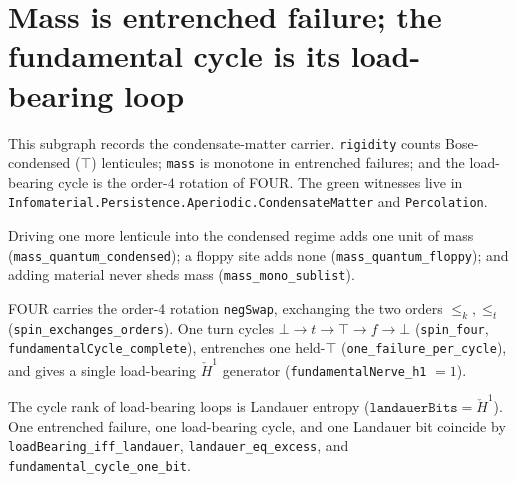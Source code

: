 \section{Mass is entrenched failure; the fundamental cycle is its load-bearing loop}

This subgraph records the condensate-matter carrier.  \texttt{rigidity} counts
Bose-condensed ($\top$) lenticules; \texttt{mass} is monotone in entrenched
failures; and the load-bearing cycle is the order-$4$ rotation of FOUR.  The
green witnesses live in
\texttt{Infomaterial.Persistence.Aperiodic.CondensateMatter} and \texttt{Percolation}.

\begin{theorem}\label{thm:mass-quantum}\leanok{}
Driving one more lenticule into the condensed regime adds one unit of mass
(\texttt{mass\_quantum\_condensed}); a floppy site adds none
(\texttt{mass\_quantum\_floppy}); and adding material never sheds mass
(\texttt{mass\_mono\_sublist}).
\end{theorem}

\begin{theorem}\label{thm:fundamental-cycle-local-h1}\leanok{}
FOUR carries the order-$4$ rotation \texttt{negSwap}, exchanging the two orders
$\le_k,\le_t$ (\texttt{spin\_exchanges\_orders}).  One turn cycles
$\bot \to t \to \top \to f \to \bot$
(\texttt{spin\_four}, \texttt{fundamentalCycle\_complete}), entrenches one
held-$\top$ (\texttt{one\_failure\_per\_cycle}), and gives a single
load-bearing $\check H^1$ generator (\texttt{fundamentalNerve\_h1} $=1$).
\end{theorem}

\begin{theorem}\label{thm:mass-is-landauer}\leanok{}
The cycle rank of load-bearing loops is Landauer entropy
($\texttt{landauerBits}=\check H^1$).  One entrenched failure, one load-bearing
cycle, and one Landauer bit coincide by
\texttt{loadBearing\_iff\_landauer}, \texttt{landauer\_eq\_excess}, and
\texttt{fundamental\_cycle\_one\_bit}.
\end{theorem}


